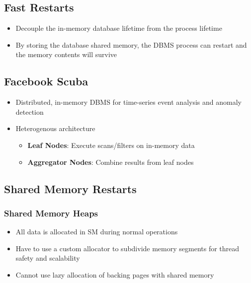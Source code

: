 \documentclass[11pt]{article}
\begin{document}
    \subsection*{Fast Restarts~\cite{p541-goel}}
    \begin{itemize}
        \item Decouple the in-memory database lifetime from the process lifetime
        \item By storing the database shared memory, the DBMS process can restart and the memory contents will survive
    \end{itemize}

    \subsection*{Facebook Scuba}
    \begin{itemize}
        \item Distributed, in-memory DBMS for time-series event analysis and anomaly detection
        \item Heterogenous architecture
        \begin{itemize}
            \item \textbf{Leaf Nodes}: Execute scans/filters on in-memory data
            \item \textbf{Aggregator Nodes}: Combine results from leaf nodes
        \end{itemize}
    \end{itemize}

    \subsection*{Shared Memory Restarts}

        \subsubsection*{Shared Memory Heaps}
        \begin{itemize}
            \item All data is allocated in SM during normal operations
            \item Have to use a custom allocator to subdivide memory segments for thread safety and scalability
            \item Cannot use lazy allocation of backing pages with shared memory
        \end{itemize}
\end{document}
